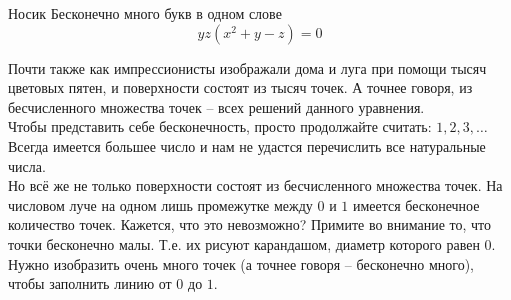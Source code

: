 \begin{surferPage}{Носик}
Бесконечно много букв в одном слове\\
\smallskip
\[y z (x^2	+ y - z)	= 0\]

\vspace{0.3cm}
Почти также как импрессионисты изображали дома и луга при помощи тысяч цветовых пятен, и поверхности состоят из тысяч точек. А точнее говоря, из бесчисленного множества точек – всех решений данного уравнения. \\
\vspace{0.3cm}
Чтобы представить себе бесконечность, просто продолжайте считать: $1, 2, 3,\dotsc$\\
Всегда имеется большее число и нам не удастся перечислить все натуральные числа.\\
\vspace{0.3cm}
Но всё же не только поверхности состоят из бесчисленного множества точек. На числовом луче на одном лишь промежутке между $0$ и $1$ имеется бесконечное количество точек. Кажется, что это невозможно? Примите во внимание то, что точки бесконечно малы. Т.е. их рисуют карандашом, диаметр которого равен $0$. Нужно изобразить очень много точек (а точнее говоря – бесконечно много), чтобы заполнить линию от $0$ до $1$.
\end{surferPage}
